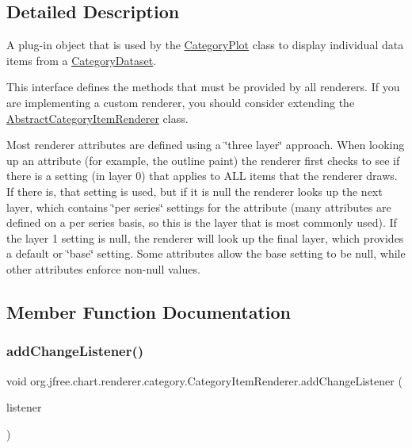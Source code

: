 \subsection{Detailed Description}
A plug-\/in object that is used by the \mbox{\hyperlink{}{Category\+Plot}} class to display individual data items from a \mbox{\hyperlink{}{Category\+Dataset}}. 

This interface defines the methods that must be provided by all renderers. If you are implementing a custom renderer, you should consider extending the \mbox{\hyperlink{classorg_1_1jfree_1_1chart_1_1renderer_1_1category_1_1_abstract_category_item_renderer}{Abstract\+Category\+Item\+Renderer}} class. 

Most renderer attributes are defined using a \char`\"{}three layer\char`\"{} approach. When looking up an attribute (for example, the outline paint) the renderer first checks to see if there is a setting (in layer 0) that applies to A\+LL items that the renderer draws. If there is, that setting is used, but if it is {\ttfamily null} the renderer looks up the next layer, which contains \char`\"{}per series\char`\"{} settings for the attribute (many attributes are defined on a per series basis, so this is the layer that is most commonly used). If the layer 1 setting is {\ttfamily null}, the renderer will look up the final layer, which provides a default or \char`\"{}base\char`\"{} setting. Some attributes allow the base setting to be {\ttfamily null}, while other attributes enforce non-\/{\ttfamily null} values. 

\subsection{Member Function Documentation}
\mbox{\label{interfaceorg_1_1jfree_1_1chart_1_1renderer_1_1category_1_1_category_item_renderer_af348fdca7f41a5ea21578021e28e9b49}} 
\subsubsection{\texorpdfstring{add\+Change\+Listener()}{addChangeListener()}}
{\footnotesize\ttfamily void org.\+jfree.\+chart.\+renderer.\+category.\+Category\+Item\+Renderer.\+add\+Change\+Listener (\begin{DoxyParamCaption}\item[{\mbox{\hyperlink{interfaceorg_1_1jfree_1_1chart_1_1event_1_1_renderer_change_listener}{Renderer\+Change\+Listener}}}]{listener }\end{DoxyParamCaption})}

